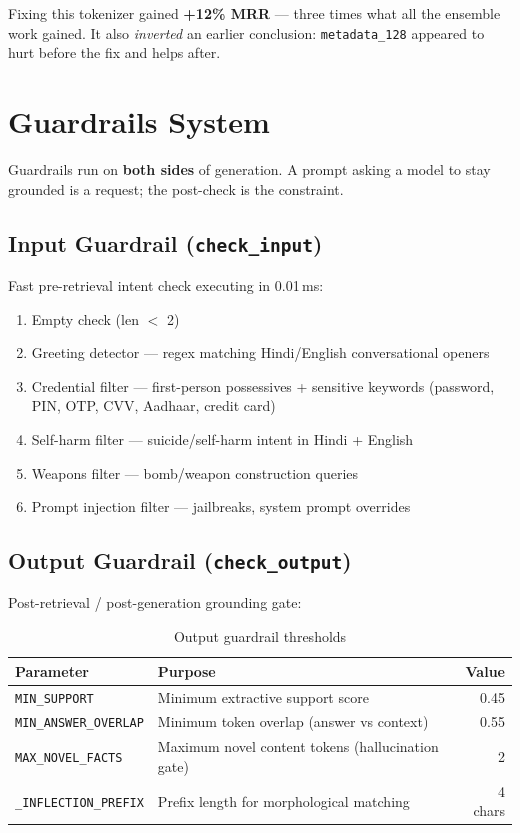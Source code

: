 \documentclass[12pt,a4paper]{article}
\begin{document}
\begin{importantbox}
Fixing this tokenizer gained \textbf{+12\% MRR} --- three times what all the ensemble work gained. It also \textit{inverted} an earlier conclusion: \texttt{metadata\_128} appeared to hurt before the fix and helps after.
\end{importantbox}


\section{Guardrails System}

Guardrails run on \textbf{both sides} of generation. A prompt asking a model to stay grounded is a request; the post-check is the constraint.

\subsection{Input Guardrail (\texttt{check\_input})}

Fast pre-retrieval intent check executing in 0.01\,ms:

\begin{enumerate}
    \item Empty check (len $<$ 2)
    \item Greeting detector --- regex matching Hindi/English conversational openers
    \item Credential filter --- first-person possessives + sensitive keywords (password, PIN, OTP, CVV, Aadhaar, credit card)
    \item Self-harm filter --- suicide/self-harm intent in Hindi + English
    \item Weapons filter --- bomb/weapon construction queries
    \item Prompt injection filter --- jailbreaks, system prompt overrides
\end{enumerate}

\subsection{Output Guardrail (\texttt{check\_output})}

Post-retrieval / post-generation grounding gate:

\begin{table}[H]
\centering
\begin{tabular}{llr}
\toprule
\textbf{Parameter} & \textbf{Purpose} & \textbf{Value} \\
\midrule
\texttt{MIN\_SUPPORT}         & Minimum extractive support score           & 0.45 \\
\texttt{MIN\_ANSWER\_OVERLAP} & Minimum token overlap (answer vs context)  & 0.55 \\
\texttt{MAX\_NOVEL\_FACTS}    & Maximum novel content tokens (hallucination gate) & 2 \\
\texttt{\_INFLECTION\_PREFIX} & Prefix length for morphological matching    & 4 chars \\
\bottomrule
\end{tabular}
\caption{Output guardrail thresholds}
\end{table}
\end{document}
